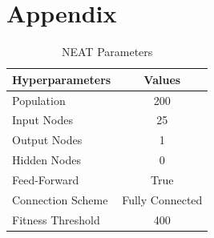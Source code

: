\documentclass[letterpaper, 12pt]{article}
\begin{document}
\section{Appendix}

\begin{table}[H]
\centering
\caption{NEAT Parameters}
\label{table:neat}
\begin{NiceTabular}{X|c}
\toprule
\textbf{Hyperparameters} & \textbf{Values} \\
\midrule
Population  & 200 \\
Input Nodes  & 25 \\
Output Nodes  & 1 \\
Hidden Nodes & 0 \\
Feed-Forward & True \\
Connection Scheme & Fully Connected \\
Fitness Threshold & 400 \\
\bottomrule
\end{NiceTabular}
\end{table}
\end{document}
